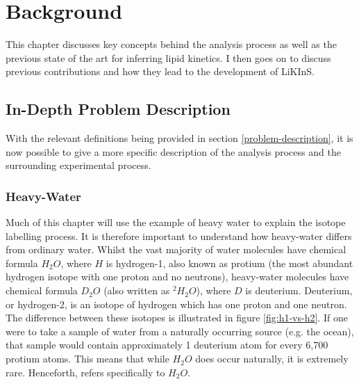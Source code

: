 \documentclass{l4proj}
\begin{document}
\chapter{Background}\label{background}
This chapter discusses key concepts behind the analysis process as well as the previous state of the art for inferring lipid kinetics. I then goes on to discuss previous contributions and how they lead to the development of LiKInS.


\section{In-Depth Problem Description}
With the relevant definitions being provided in section \ref{problem-description}, it is now possible to give a more specific description of the analysis process and the surrounding experimental process.

\subsection{Heavy-Water}
Much of this chapter will use the example of heavy water to explain the isotope labelling process. It is therefore important to understand how heavy-water differs from ordinary water. Whilst the vast majority of water molecules have chemical formula $H_{2}O$, where $H$ is hydrogen-1, also known as protium (the most abundant hydrogen isotope with one proton and no neutrons), heavy-water molecules have chemical formula $D_2O$ (also written as $^{2}H_{2}O$), where $D$ is deuterium. Deuterium, or hydrogen-2, is an isotope of hydrogen which has one proton and one neutron. The difference between these isotopes is illustrated in figure \ref{fig:h1-vs-h2}.
If one were to take a sample of water from a naturally occurring source (e.g. the ocean), that sample would contain approximately 1 deuterium atom for every 6,700 \citep{heavy-water} protium atoms. This means that while $H_{2}O$ does occur naturally, it is extremely rare. Henceforth,  refers specifically to $H_2O$.
\end{document}
